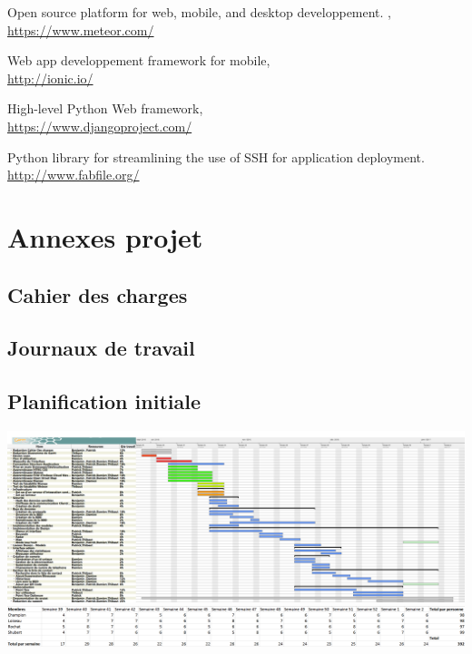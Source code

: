 \documentclass[french]{article}
\begin{document}
	\begin{thebibliography}{9}
		Open source platform for web, mobile, and desktop developpement. ,\\ \url{https://www.meteor.com/}
		
		Web app developpement framework for mobile,\\ \url{http://ionic.io/}
		
		High-level Python Web framework, \\ \url{https://www.djangoproject.com/}
		
		Python library for streamlining the use of SSH for application deployment.\\ \url{http://www.fabfile.org/}
	\end{thebibliography}
			
	\newpage
		
		
	\section{Annexes projet}
		\subsection{Cahier des charges}
			
		\subsection{Journaux de travail}
			
		\subsection{Planification initiale}
			
			
			\centering
			\includegraphics[angle=90,width=\linewidth,height=\textheight]{../diagramme-de-gantt/diagramme-de-gantt.png}
			\centering
			\includegraphics[angle=90,height=\textheight]{../diagramme-de-gantt/tableau-heures-personnes}
				
\end{document}
